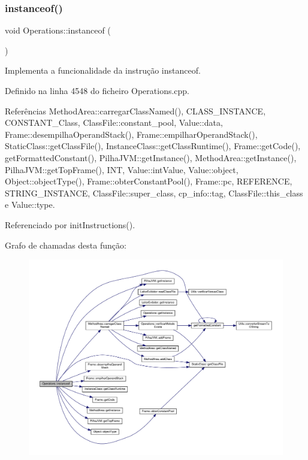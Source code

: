 \subsubsection{\texorpdfstring{instanceof()}{instanceof()}}
{\footnotesize\ttfamily void Operations\+::instanceof (\begin{DoxyParamCaption}{ }\end{DoxyParamCaption})\hspace{0.3cm}{\ttfamily [private]}}



Implementa a funcionalidade da instrução instanceof. 



Definido na linha 4548 do ficheiro Operations.\+cpp.



Referências Method\+Area\+::carregar\+Class\+Named(), C\+L\+A\+S\+S\+\_\+\+I\+N\+S\+T\+A\+N\+CE, C\+O\+N\+S\+T\+A\+N\+T\+\_\+\+Class, Class\+File\+::constant\+\_\+pool, Value\+::data, Frame\+::desempilha\+Operand\+Stack(), Frame\+::empilhar\+Operand\+Stack(), Static\+Class\+::get\+Class\+File(), Instance\+Class\+::get\+Class\+Runtime(), Frame\+::get\+Code(), get\+Formatted\+Constant(), Pilha\+J\+V\+M\+::get\+Instance(), Method\+Area\+::get\+Instance(), Pilha\+J\+V\+M\+::get\+Top\+Frame(), I\+NT, Value\+::int\+Value, Value\+::object, Object\+::object\+Type(), Frame\+::obter\+Constant\+Pool(), Frame\+::pc, R\+E\+F\+E\+R\+E\+N\+CE, S\+T\+R\+I\+N\+G\+\_\+\+I\+N\+S\+T\+A\+N\+CE, Class\+File\+::super\+\_\+class, cp\+\_\+info\+::tag, Class\+File\+::this\+\_\+class e Value\+::type.



Referenciado por init\+Instructions().

Grafo de chamadas desta função\+:\nopagebreak
\begin{figure}[H]
\begin{center}
\leavevmode
\includegraphics[width=350pt]{classOperations_a22e16734b441e5cf7e6bdfb09fb152fa_cgraph}
\end{center}
\end{figure}
\mbox{\label{classOperations_a9206595fad5d3ac24514b2dfd6a013da}} 
